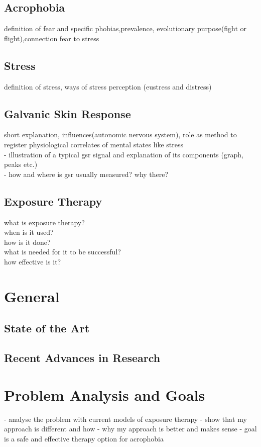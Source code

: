\subsection{Acrophobia} 
definition of fear and specific phobias,prevalence, evolutionary 	 purpose(fight or flight),connection fear to stress
  
\subsection{Stress}
definition of stress, ways of stress perception (eustress and distress)

\subsection{Galvanic Skin Response}
short explanation, influences(autonomic nervous system), role as method  to register physiological correlates of mental states like stress\\

- illustration of a typical gsr signal and explanation of its components (graph, peaks etc.) \\

- how and where is gsr usually measured? why there?\\

\subsection{Exposure Therapy}
what is exposure therapy?\\ 
when is it used? \\
how is it done?\\
what is needed for it to be successful? \\
how effective is it?\\

\section{General}
\subsection{State of the Art}
\subsection{Recent Advances in Research}
\section{Problem Analysis and Goals}
- analyse the problem with current models of exposure therapy
- show that my approach is different and how
- why my approach is better and makes sense
- goal is a safe and effective therapy option for acrophobia


